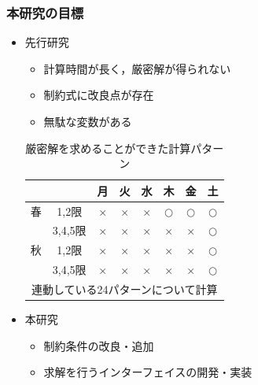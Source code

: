 \documentclass[dvipdfmx,12pt]{beamer}
\begin{document}
\begin{frame}\frametitle{本研究の目標}
\begin{itemize}
\item 先行研究
\begin{itemize}
\item 計算時間が長く，厳密解が得られない\\
\item 制約式に改良点が存在\\
\item 無駄な変数がある\\
\end{itemize}
\vspace{-10pt}

\begin{table}
\begin{center}
\caption{厳密解を求めることができた計算パターン}
\vspace{-5pt}
\begin{tabular}{cc|cccccc}\hline
$~$&$~$&月&火&水&木&金&土 \\ \hline
春&1,2限&$\times$&$\times$&$\times$&$\bigcirc$&$\bigcirc$&$\bigcirc$ \\ 
$~$&3,4,5限&$\times$&$\times$&$\times$&$\times$&$\times$&$\bigcirc$ \\ \hline
秋&1,2限&$\times$&$\times$&$\times$&$\times$&$\times$&$\bigcirc$ \\ 
$~$&3,4,5限&$\times$&$\times$&$\times$&$\times$&$\times$&$\bigcirc$ \\ \hline
\multicolumn{8}{c}{連動している24パターンについて計算}\\
\end{tabular}
\end{center}
\end{table}

\item 本研究
\begin{itemize}
\item 制約条件の改良・追加
\item 求解を行うインターフェイスの開発・実装
\end{itemize}

\end{itemize}

\end{frame}
\end{document}
